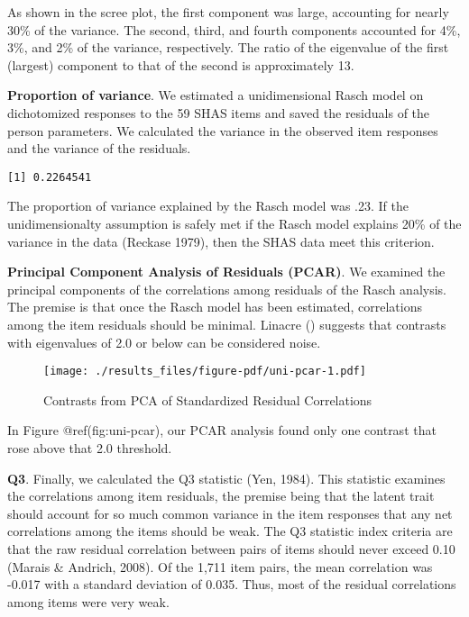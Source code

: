 \documentclass[
  letterpaper,
  DIV=11,
  numbers=noendperiod]{scrreport}
\begin{document}
As shown in the scree plot, the first component was large, accounting
for nearly 30\% of the variance. The second, third, and fourth
components accounted for 4\%, 3\%, and 2\% of the variance,
respectively. The ratio of the eigenvalue of the first (largest)
component to that of the second is approximately 13.

\textbf{Proportion of variance}. We estimated a unidimensional Rasch
model on dichotomized responses to the 59 SHAS items and saved the
residuals of the person parameters. We calculated the variance in the
observed item responses and the variance of the residuals.

\begin{verbatim}
[1] 0.2264541
\end{verbatim}

The proportion of variance explained by the Rasch model was .23. If the
unidimensionalty assumption is safely met if the Rasch model explains
20\% of the variance in the data (Reckase 1979), then the SHAS data meet
this criterion.

\textbf{Principal Component Analysis of Residuals (PCAR)}. We examined
the principal components of the correlations among residuals of the
Rasch analysis. The premise is that once the Rasch model has been
estimated, correlations among the item residuals should be minimal.
Linacre () suggests that contrasts with eigenvalues of 2.0 or below can
be considered noise.

\begin{figure}

{\centering \texttt{[image: ./results\_files/figure-pdf/uni-pcar-1.pdf]}

}

\caption{Contrasts from PCA of Standardized Residual Correlations}

\end{figure}

In Figure @ref(fig:uni-pcar), our PCAR analysis found only one contrast
that rose above that 2.0 threshold.

\textbf{Q3}. Finally, we calculated the Q3 statistic (Yen, 1984). This
statistic examines the correlations among item residuals, the premise
being that the latent trait should account for so much common variance
in the item responses that any net correlations among the items should
be weak. The Q3 statistic index criteria are that the raw residual
correlation between pairs of items should never exceed 0.10 (Marais \&
Andrich, 2008). Of the 1,711 item pairs, the mean correlation was -0.017
with a standard deviation of 0.035. Thus, most of the residual
correlations among items were very weak.
\end{document}
